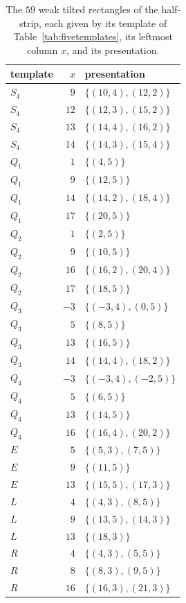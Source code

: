 \begin{table}[t]
\begin{tabular}{@{}lrl@{}}
\toprule
template & $x$ & presentation \\
\midrule
$S_4$ & $9$ & $\{(10,4),(12,2)\}$ \\
$S_4$ & $12$ & $\{(12,3),(15,2)\}$ \\
$S_4$ & $13$ & $\{(14,4),(16,2)\}$ \\
$S_4$ & $14$ & $\{(14,3),(15,4)\}$ \\
$Q_1$ & $1$ & $\{(4,5)\}$ \\
$Q_1$ & $9$ & $\{(12,5)\}$ \\
$Q_1$ & $14$ & $\{(14,2),(18,4)\}$ \\
$Q_1$ & $17$ & $\{(20,5)\}$ \\
$Q_2$ & $1$ & $\{(2,5)\}$ \\
$Q_2$ & $9$ & $\{(10,5)\}$ \\
$Q_2$ & $16$ & $\{(16,2),(20,4)\}$ \\
$Q_2$ & $17$ & $\{(18,5)\}$ \\
$Q_3$ & $-3$ & $\{(-3,4),(0,5)\}$ \\
$Q_3$ & $5$ & $\{(8,5)\}$ \\
$Q_3$ & $13$ & $\{(16,5)\}$ \\
$Q_3$ & $14$ & $\{(14,4),(18,2)\}$ \\
$Q_4$ & $-3$ & $\{(-3,4),(-2,5)\}$ \\
$Q_4$ & $5$ & $\{(6,5)\}$ \\
$Q_4$ & $13$ & $\{(14,5)\}$ \\
$Q_4$ & $16$ & $\{(16,4),(20,2)\}$ \\
$E$ & $5$ & $\{(5,3),(7,5)\}$ \\
$E$ & $9$ & $\{(11,5)\}$ \\
$E$ & $13$ & $\{(15,5),(17,3)\}$ \\
$L$ & $4$ & $\{(4,3),(8,5)\}$ \\
$L$ & $9$ & $\{(13,5),(14,3)\}$ \\
$L$ & $13$ & $\{(18,3)\}$ \\
$R$ & $4$ & $\{(4,3),(5,5)\}$ \\
$R$ & $8$ & $\{(8,3),(9,5)\}$ \\
$R$ & $16$ & $\{(16,3),(21,3)\}$ \\
\bottomrule
\end{tabular}
\caption{The $59$ weak tilted rectangles of the half-strip, each given by its template of
Table~\ref{tab:fivetemplates}, its leftmost column $x$, and its presentation.}
\label{tab:fiveweak}
\end{table}

